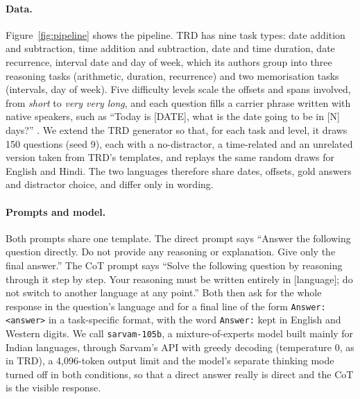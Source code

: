 \documentclass[11pt]{article}
\begin{document}
\paragraph{Data.}
Figure~\ref{fig:pipeline} shows the pipeline. TRD has nine task types: date addition and subtraction, time addition and subtraction, date and time duration, date recurrence, interval date and day of week, which its authors group into three reasoning tasks (arithmetic, duration, recurrence) and two memorisation tasks (intervals, day of week). Five difficulty levels scale the offsets and spans involved, from \emph{short} to \emph{very very long}, and each question fills a carrier phrase written with native speakers, such as ``Today is [DATE], what is the date going to be in [N] days?'' \citep{mazzia-etal-2026-benchmarking}. We extend the TRD generator so that, for each task and level, it draws 150 questions (seed 9), each with a no-distractor, a time-related and an unrelated version taken from TRD's templates, and replays the same random draws for English and Hindi. The two languages therefore share dates, offsets, gold answers and distractor choice, and differ only in wording.

\paragraph{Prompts and model.}
Both prompts share one template. The direct prompt says ``Answer the following question directly. Do not provide any reasoning or explanation. Give only the final answer.'' The CoT prompt says ``Solve the following question by reasoning through it step by step. Your reasoning must be written entirely in [language]; do not switch to another language at any point.'' Both then ask for the whole response in the question's language and for a final line of the form \texttt{Answer: <answer>} in a task-specific format, with the word \texttt{Answer:} kept in English and Western digits. We call \texttt{sarvam-105b}, a mixture-of-experts model built mainly for Indian languages, through Sarvam's API with greedy decoding (temperature 0, as in TRD), a 4,096-token output limit and the model's separate thinking mode turned off in both conditions, so that a direct answer really is direct and the CoT is the visible response.
\end{document}
